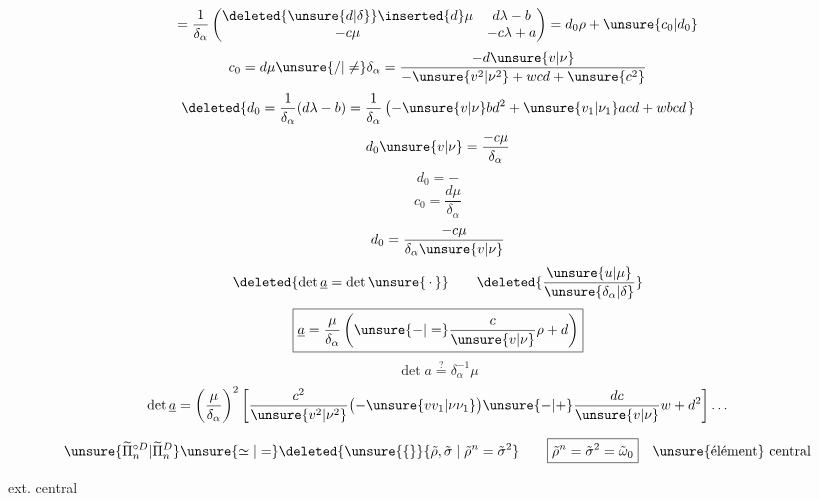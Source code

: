\[
=\frac{1}{\delta_\alpha}
\begin{pmatrix}
\deleted{\unsure{d|\delta}}\inserted{d}\mu&d\lambda-b\\
-c\mu&-c\lambda+a
\end{pmatrix}
=d_0\rho+\unsure{c_0|d_0}
\]
\[
c_0=d\mu\unsure{/|\ne}\delta_\alpha
=\frac{-d\unsure{v|\nu}}{-\unsure{v^2|\nu^2}+wcd+\unsure{c^2}}
\]
\[
\deleted{
d_0=\frac{1}{\delta_\alpha}(d\lambda-b)
=\frac{1}{\delta_\alpha}
\left(-\unsure{v|\nu}bd^2+\unsure{v_1|\nu_1}acd+w bcd\right.
}
\]
\[
d_0\unsure{v|\nu}=\frac{-c\mu}{\delta_\alpha}
\]
\[
d_0=-
\]
\[
c_0=\frac{d\mu}{\delta_\alpha}
\]
\[
d_0=\frac{-c\mu}{\delta_\alpha\unsure{v|\nu}}
\]
\[
\deleted{\det\underline{a}=\det\unsure{\,\cdot\,}}
\qquad
\deleted{\frac{\unsure{u|\mu}}{\unsure{\delta_\alpha|\delta}}}
\]
\[
\boxed{\underline{a}=\frac{\mu}{\delta_\alpha}
\left(\unsure{-|=}\frac{c}{\unsure{v|\nu}}\rho+d\right)}
\]
\[
\det a\overset{?}{=}\delta_\alpha^{-1}\mu
\]
\[
\det\underline{a}=\left(\frac{\mu}{\delta_\alpha}\right)^2
\left[\frac{c^2}{\unsure{v^2|\nu^2}}
\bigl(-\unsure{vv_1|\nu\nu_1}\bigr)
\unsure{-|+}\frac{dc}{\unsure{v|\nu}}w+d^2\right]\ldots
\]



\[
\unsure{\widetilde{\Pi}_n^{\circ D}|\widetilde{\Pi}_n^D}
\unsure{\simeq|=}
\deleted{\unsure{\{}}
\{\tilde\rho,\tilde\sigma\mid\tilde\rho^n=\tilde\sigma^2\}
\qquad
\boxed{\tilde\rho^n=\tilde\sigma^2=\tilde\omega_0}
\quad\text{\unsure{élément} central}
\]

ext. central

